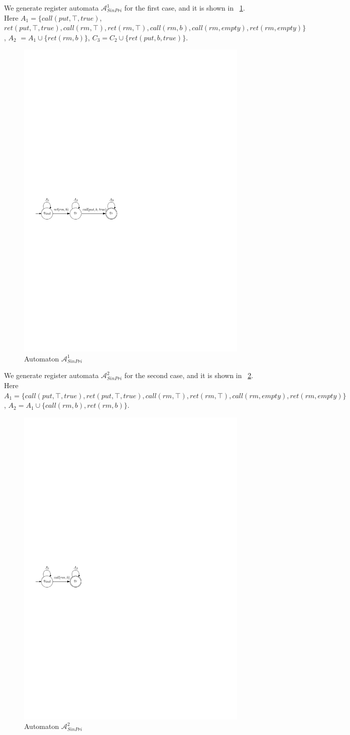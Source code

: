 We generate register automata $\mathcal{A}_{\textit{SinPri}}^1$ for the first case, and it is shown in \figurename~\ref{fig:automata for FIFO-1 in appendix}. Here $A_1 = \{ \textit{call}(\textit{put},\top,\textit{true})$, $\textit{ret}(\textit{put},\top,\textit{true}), \textit{call}(\textit{rm},\top),\textit{ret}(\textit{rm},\top),\textit{call}(\textit{rm},b),\textit{call}(\textit{rm},\textit{empty}),\textit{ret}(\textit{rm},\textit{empty}) \}$, $A_2$ $= A_1 \cup \{ \textit{ret}(\textit{rm},b) \}$, $C_3 = C_2 \cup \{ \textit{ret}(\textit{put},b,\textit{true}) \}$.


\begin{figure}[htbp]
  \centering
  \includegraphics[width=0.5 \textwidth]{figures/PIC_AUTO_FIFO_1.pdf}
  \caption{Automaton $\mathcal{A}_{\textit{SinPri}}^1$}
  \label{fig:automata for FIFO-1 in appendix}
\end{figure}


We generate register automata $\mathcal{A}_{\textit{SinPri}}^2$ for the second case, and it is shown in \figurename~\ref{fig:automata for FIFO-2}. Here $A_1 = \{ \textit{call}(\textit{put},\top,\textit{true}),\textit{ret}(\textit{put},\top,\textit{true}), \textit{call}(\textit{rm},\top),\textit{ret}(\textit{rm},\top),\textit{call}(\textit{rm},\textit{empty}),\textit{ret}(\textit{rm},\textit{empty}) \}$, $A_2 = A_1 \cup \{ \textit{call}(\textit{rm},b), \textit{ret}(\textit{rm},b) \}$.


\begin{figure}[htbp]
  \centering
  \includegraphics[width=0.3 \textwidth]{figures/PIC_AUTO_FIFO_2.pdf}
  \caption{Automaton $\mathcal{A}_{\textit{SinPri}}^2$}
  \label{fig:automata for FIFO-2}
\end{figure}

